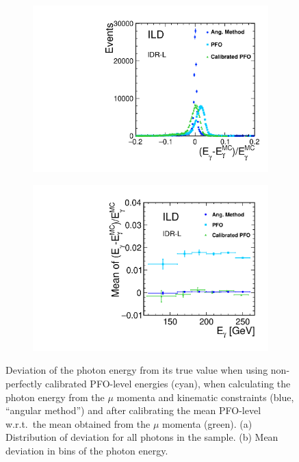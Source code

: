 \begin{figure}[htbp]
\begin{subfigure}{0.49\hsize} 
 \includegraphics[width=\textwidth]{Performance/fig/IDR1MethodComp.pdf}
 \caption{ \label{fig:gammaZ:meanE:allE}}
 \end{subfigure}
\begin{subfigure}{0.49\hsize} 
 \includegraphics[width=\textwidth]{Performance/fig/IDR5ECentervalueE.pdf}
 \caption{  \label{fig:gammaZ:meanE:vsE}}
 \end{subfigure}
\caption{
Deviation of the photon energy from its true value when using non-perfectly calibrated PFO-level energies (cyan), when calculating the photon energy from the $\mu$ momenta and kinematic constraints (blue, ``angular method'') and after calibrating the mean PFO-level w.r.t.\ the mean obtained from the $\mu$ momenta (green).  
(a) Distribution of deviation for all photons in the sample.
(b) Mean deviation in bins of the photon energy.
}
\label{fig:gammaZ:meanE}
\end{figure}

